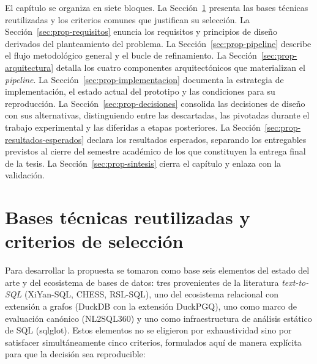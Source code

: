 El capítulo se organiza en siete bloques. La Sección~\ref{sec:prop-bases} presenta las bases técnicas reutilizadas y los criterios comunes que justifican su selección. La Sección~\ref{sec:prop-requisitos} enuncia los requisitos y principios de diseño derivados del planteamiento del problema. La Sección~\ref{sec:prop-pipeline} describe el flujo metodológico general y el bucle de refinamiento. La Sección~\ref{sec:prop-arquitectura} detalla los cuatro componentes arquitectónicos que materializan el \emph{pipeline}. La Sección~\ref{sec:prop-implementacion} documenta la estrategia de implementación, el estado actual del prototipo y las condiciones para su reproducción. La Sección~\ref{sec:prop-decisiones} consolida las decisiones de diseño con sus alternativas, distinguiendo entre las descartadas, las pivotadas durante el trabajo experimental y las diferidas a etapas posteriores. La Sección~\ref{sec:prop-resultados-esperados} declara los resultados esperados, separando los entregables previstos al cierre del semestre académico de los que constituyen la entrega final de la tesis. La Sección~\ref{sec:prop-sintesis} cierra el capítulo y enlaza con la validación.

\section{Bases técnicas reutilizadas y criterios de selección}
\label{sec:prop-bases}

Para desarrollar la propuesta se tomaron como base seis elementos del estado del arte y del ecosistema de bases de datos: tres provenientes de la literatura \emph{text-to-SQL} (XiYan-SQL, CHESS, RSL-SQL), uno del ecosistema relacional con extensión a grafos (DuckDB con la extensión DuckPGQ), uno como marco de evaluación canónico (NL2SQL360) y uno como infraestructura de análisis estático de SQL (sqlglot). Estos elementos no se eligieron por exhaustividad sino por satisfacer simultáneamente cinco criterios, formulados aquí de manera explícita para que la decisión sea reproducible:

